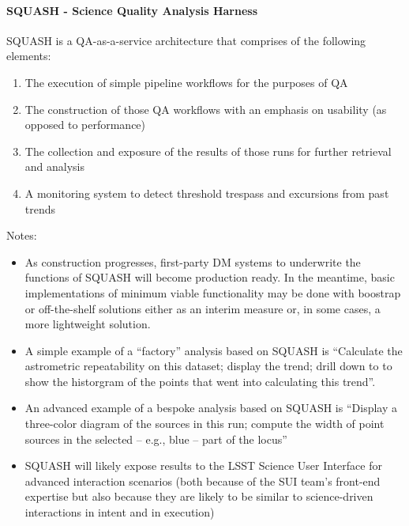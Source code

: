 \paragraph{SQUASH - Science Quality Analysis Harness}
\label{sec:qaSquash}

SQUASH is a QA-as-a-service architecture that comprises of the
following elements:

\begin{enumerate}

\item The execution of simple pipeline workflows for the purposes of QA

\item The construction of those QA workflows with an emphasis on usability (as opposed to performance)

\item The collection and exposure of the results of those runs for further retrieval and analysis

\item A monitoring system to detect threshold trespass and excursions from past trends

\end{enumerate}

Notes:

\begin{itemize}

\item As construction progresses, first-party DM systems to underwrite the functions of SQUASH will become production ready. In the meantime, basic implementations of minimum viable functionality may be done with boostrap or off-the-shelf solutions either as an interim measure or, in some cases, a more lightweight solution.

\item A simple example of a ``factory'' analysis based on SQUASH is ``Calculate the astrometric repeatability on this dataset; display the trend; drill down to to show the historgram of the points that went into calculating this trend''.

\item An advanced example of a bespoke analysis based on SQUASH is “Display a three-color diagram of the sources in this run; compute the width of point sources in the selected -- e.g., blue -- part of the locus''

\item SQUASH will likely expose results to the LSST Science User Interface for advanced interaction scenarios (both because of the SUI team's front-end expertise but also because they are likely to be similar to science-driven interactions in intent and in execution)

\end{itemize}


